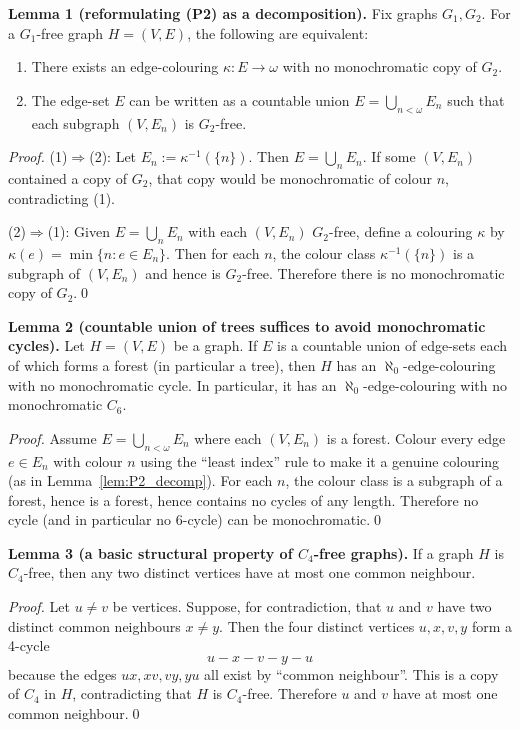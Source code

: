 \medskip
\noindent\textbf{Lemma 1 (reformulating (P2) as a decomposition).}\label{lem:P2_decomp}
Fix graphs $G_1,G_2$.
For a $G_1$-free graph $H=(V,E)$, the following are equivalent:
\begin{enumerate}
\item There exists an edge-colouring $\kappa:E\to\omega$ with no monochromatic copy of $G_2$.
\item The edge-set $E$ can be written as a countable union $E=\bigcup_{n<\omega} E_n$ such that each subgraph $(V,E_n)$ is $G_2$-free.
\end{enumerate}

\emph{Proof.}
(1)$\Rightarrow$(2): Let $E_n:=\kappa^{-1}(\{n\})$. Then $E=\bigcup_n E_n$. If some $(V,E_n)$ contained a copy of $G_2$, that copy would be monochromatic of colour $n$, contradicting (1).

(2)$\Rightarrow$(1): Given $E=\bigcup_n E_n$ with each $(V,E_n)$ $G_2$-free, define a colouring $\kappa$ by $\kappa(e)=\min\{n:e\in E_n\}$.
Then for each $n$, the colour class $\kappa^{-1}(\{n\})$ is a subgraph of $(V,E_n)$ and hence is $G_2$-free.
Therefore there is no monochromatic copy of $G_2$.\qed

\medskip
\noindent\textbf{Lemma 2 (countable union of trees suffices to avoid monochromatic cycles).}\label{lem:trees_avoid_cycles}
Let $H=(V,E)$ be a graph.
If $E$ is a countable union of edge-sets each of which forms a forest (in particular a tree), then $H$ has an $\aleph_0$-edge-colouring with no monochromatic cycle.
In particular, it has an $\aleph_0$-edge-colouring with no monochromatic $C_6$.

\emph{Proof.}
Assume $E=\bigcup_{n<\omega}E_n$ where each $(V,E_n)$ is a forest.
Colour every edge $e\in E_n$ with colour $n$ using the ``least index'' rule to make it a genuine colouring (as in Lemma~\ref{lem:P2_decomp}).
For each $n$, the colour class is a subgraph of a forest, hence is a forest, hence contains no cycles of any length.
Therefore no cycle (and in particular no $6$-cycle) can be monochromatic.\qed

\medskip
\noindent\textbf{Lemma 3 (a basic structural property of $C_4$-free graphs).}\label{lem:C4_codegree}
If a graph $H$ is $C_4$-free, then any two distinct vertices have at most one common neighbour.

\emph{Proof.}
Let $u\neq v$ be vertices.
Suppose, for contradiction, that $u$ and $v$ have two distinct common neighbours $x\neq y$.
Then the four distinct vertices $u,x,v,y$ form a 4-cycle
\[
 u-x-v-y-u
\]
because the edges $ux,xv,vy,yu$ all exist by ``common neighbour''.
This is a copy of $C_4$ in $H$, contradicting that $H$ is $C_4$-free.
Therefore $u$ and $v$ have at most one common neighbour.\qed

